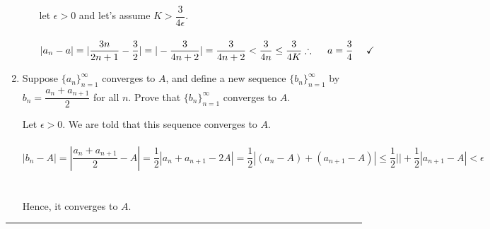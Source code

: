 \documentclass[fleqn]{article}
\begin{document}
\begin{enumerate}
\begin{enumerate}
        \textcolor{hwColor}{
          let $\epsilon > 0$ and let's assume $K>\dfrac{3}{4 \epsilon}$.
          \\
          \\
          $
            |a_n-a|=|\dfrac{3n}{2n+1}-\dfrac{3}{2}|=|-\dfrac{3}{4n+2}|=\dfrac{3}{4n+2}<\dfrac{3}{4n}\leq \dfrac{3}{4K}
            \\
            \\
            \\
            \therefore ~~~~ a=\dfrac{3}{4} ~~~~ \checkmark
          $
        }

    \end{enumerate}

    \item Suppose $\{a_n\}_{n=1}^{\infty}$ converges to $A$, and define a new sequence $\{b_n\}_{n=1}^{\infty}$ by
    $b_n=\dfrac{a_n+a_{n+1}}{2}$ for all $n$. Prove that $\{b_n\}_{n=1}^{\infty}$ converges to $A$.

      \textcolor{hwColor}{
        Let $\epsilon > 0$. We are told that this sequence converges to $A$.
        \\
        \\
        $
          |b_n-A|=|\dfrac{a_n+a_{n+1}}{2}-A|=\dfrac{1}{2}|a_n+a_{n+1}-2A|=\dfrac{1}{2}|(a_n-A)+(a_{n+1}-A)|\leq \dfrac{1}{2} ||+\dfrac{1}{2} |a_{n+1}-A| < \epsilon
        $
        \\
        \\
        \\
        Hence, it converges to $A$. 
      }

  \end{enumerate}

  \rule{15cm}{2pt}
\end{document}

